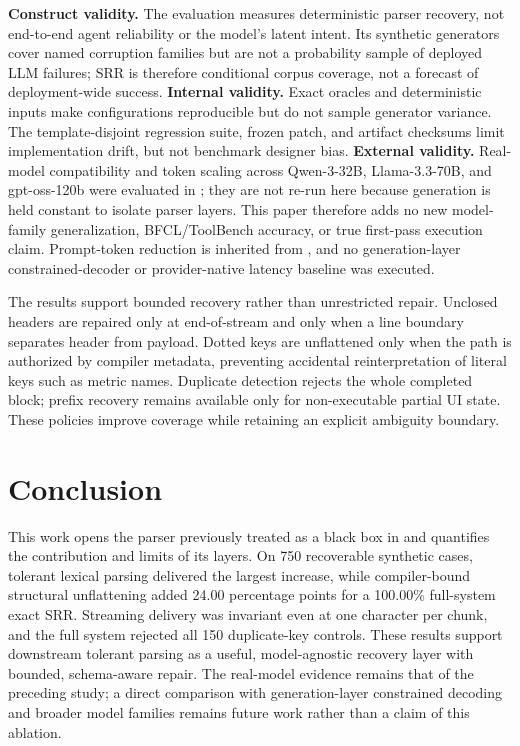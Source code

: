 \documentclass[conference]{IEEEtran}
\begin{document}
\textbf{Construct validity.} The evaluation measures deterministic parser
recovery, not end-to-end agent reliability or the model's latent intent. Its
synthetic generators cover named corruption families but are not a probability
sample of deployed LLM failures; SRR is therefore conditional corpus coverage,
not a forecast of deployment-wide success. \textbf{Internal validity.} Exact
oracles and deterministic inputs make configurations reproducible but do not
sample generator variance. The template-disjoint regression suite, frozen
patch, and artifact checksums limit implementation drift, but not benchmark
designer bias. \textbf{External validity.} Real-model compatibility and token
scaling across Qwen-3-32B, Llama-3.3-70B, and gpt-oss-120b were evaluated in
\cite{irai2026}; they are not re-run here because generation is held constant
to isolate parser layers. This paper therefore adds no new model-family
generalization, BFCL/ToolBench accuracy, or true first-pass execution claim.
Prompt-token reduction is inherited from \cite{irai2026}, and no
generation-layer constrained-decoder or provider-native latency baseline was
executed.

The results support bounded recovery rather than unrestricted repair.
Unclosed headers are repaired only at end-of-stream and only when a line
boundary separates header from payload. Dotted keys are unflattened only
when the path is authorized by compiler metadata, preventing accidental
reinterpretation of literal keys such as metric names. Duplicate detection
rejects the whole completed block; prefix recovery remains available only
for non-executable partial UI state. These policies improve coverage while
retaining an explicit ambiguity boundary.

\section{Conclusion}

This work opens the parser previously treated as a black box in
\cite{irai2026} and quantifies the contribution and limits of its layers.
On 750 recoverable synthetic cases, tolerant lexical parsing delivered the
largest increase, while compiler-bound structural unflattening added 24.00
percentage points for a 100.00\% full-system exact SRR. Streaming delivery
was invariant even at one character per chunk, and the full system rejected
all 150 duplicate-key controls. These results support downstream tolerant parsing as a
useful, model-agnostic recovery layer with bounded, schema-aware repair. The
real-model evidence remains that of the preceding study; a direct comparison
with generation-layer constrained decoding and broader model families remains
future work rather than a claim of this ablation.
\end{document}
